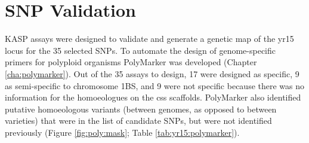 \section {SNP Validation}

KASP assays were designed to validate and generate a genetic map of the \acrshort{yr15} locus for the 35 selected SNPs.
To automate the design of genome-specific primers for polyploid organisms PolyMarker was developed (Chapter \ref{cha:polymarker}).
Out of the 35 assays to design, 17 were designed as specific, 9 as semi-specific to chromosome 1BS, and 9 were not specific because there was no information for the homoeologues on the \acrshort{css} scaffolds. 
PolyMarker also identified putative homoeologous variants (between genomes, as opposed to between varieties) that were in the list of candidate SNPs, but were not identified previously (Figure \ref{fig:poly:mask}; Table \ref{tab:yr15:polymarker}). 


